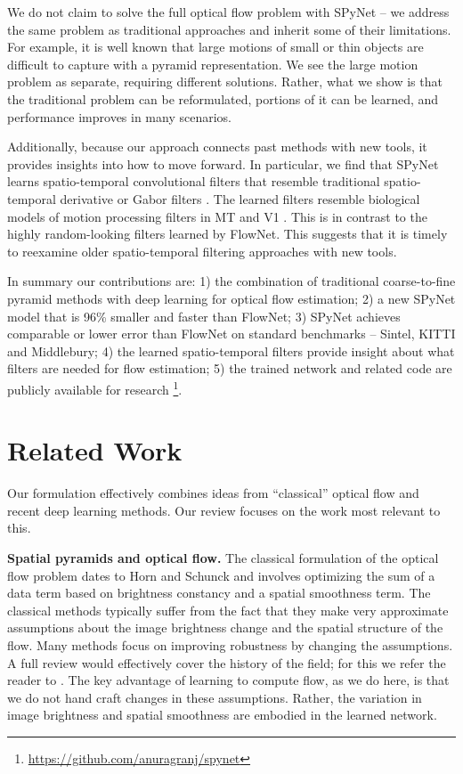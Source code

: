 \documentclass[10pt,twocolumn,letterpaper]{article}
\newcommand\myworries[1]{\textcolor{red}{#1}}
\begin{document}
We do not claim to solve the full optical flow problem with SPyNet -- we address the same problem as traditional approaches and inherit some of their limitations.  
For example, it is well known that large motions of small or thin objects are difficult to capture with a pyramid representation.  
We see the large motion problem as separate, requiring different solutions.
Rather, what we show is that the traditional problem can be reformulated, portions of it can be learned, and performance improves in many scenarios.

Additionally, because our approach connects past methods with new tools, it provides insights into how to move forward.
In particular, we find that SPyNet learns spatio-temporal convolutional filters that resemble traditional spatio-temporal derivative or Gabor filters \cite{adelson1985spatiotemporal,heeger1987model}.
The learned filters resemble biological models of motion processing filters in MT and V1 
\cite{Simoncelli1998}. %
This is in contrast to the highly random-looking filters learned by FlowNet.
This suggests that it is timely to reexamine older spatio-temporal filtering approaches with new tools.

In summary our contributions are:
1) the combination of traditional coarse-to-fine pyramid methods with deep learning for optical flow estimation;
2) a new SPyNet model that is 96\% smaller and faster than FlowNet;
3) SPyNet achieves comparable or lower error than FlowNet on standard benchmarks -- Sintel, KITTI and Middlebury;
4) the learned spatio-temporal filters provide insight about what filters are needed for flow estimation;
5) the trained network and related code are publicly available for research \footnote{\url{https://github.com/anuragranj/spynet}}.%


\section{Related Work}
Our formulation effectively combines ideas from ``classical'' optical flow and recent deep learning methods.
Our review focuses on the work most relevant to this.


{\bf Spatial pyramids and optical flow.}
The classical formulation of the optical flow problem dates to Horn and Schunck \cite{horn1981determining} and involves optimizing the sum
of a data term based on brightness constancy and a spatial smoothness term.
The classical methods typically suffer from the fact that they make very approximate assumptions about the image brightness change and the spatial structure of the flow.
Many methods focus on improving robustness by changing the assumptions.
A full review would effectively cover the history of the field; for this we refer the reader to \cite{sun2014quantitative}. %
The key advantage of learning to compute flow, as we do here, is that we do not hand craft changes in these assumptions.
Rather, the variation in image brightness and spatial smoothness are embodied in the learned network.
\end{document}
